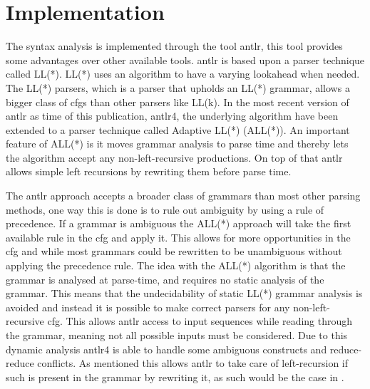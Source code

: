 \section{Implementation}\label{sec:ANTLR}
The syntax analysis is implemented through the tool \acrfull{antlr}, this tool provides some advantages over other available tools.
\acrshort{antlr} is based upon a parser technique called LL(*).
LL(*) uses an algorithm to have a varying lookahead when needed.
The LL(*) parsers, which is a parser that upholds an LL(*) grammar, allows a bigger class of \acrshort{cfg}s than other parsers like LL(k). 
In the most recent version of \acrshort{antlr} as time of this publication, \acrshort{antlr}4, the underlying algorithm have been extended to a parser technique called Adaptive LL(*) (ALL(*)).
An important feature of ALL(*) is it moves grammar analysis to parse time and thereby lets the algorithm accept any non-left-recursive productions.
On top of that \acrshort{antlr} allows simple left recursions by rewriting them before parse time.

The \acrshort{antlr} approach accepts a broader class of grammars than most other parsing methods, one way this is done is to rule out ambiguity by using a rule of precedence.
If a grammar is ambiguous the ALL(*) approach will take the first available rule in the \acrshort{cfg} and apply it.
This allows for more opportunities in the \acrshort{cfg} and while most grammars could be rewritten to be unambiguous without applying the precedence rule.
The idea with the ALL(*) algorithm is that the grammar is analysed at parse-time, and requires no static analysis of the grammar. 
This means that the undecidability of static LL(*) grammar analysis is avoided and instead it is possible to make correct parsers for any non-left-recursive \acrshort{cfg}.
This allows \acrshort{antlr} access to input sequences while reading through the grammar, meaning not all possible inputs must be considered.
Due to this dynamic analysis \acrshort{antlr}4 is able to handle some ambiguous constructs and reduce-reduce conflicts.
As mentioned this allows \acrshort{antlr} to take care of left-recursion if such is present in the grammar by rewriting it, as such would be the case in .

